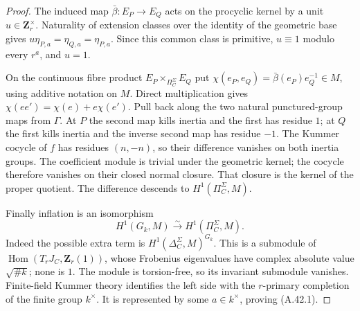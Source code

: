 \begin{proof}
The induced map $\bar\beta:E_P\to E_Q$ acts on the procyclic
kernel by a unit $u\in\mathbf Z_r^\times$. Naturality of
extension classes over the identity of the geometric base gives
$u\eta_{P,a}=\eta_{Q,a}=\eta_{P,a}$. Since this common class
is primitive, $u\equiv1$
modulo every $r^a$, and $u=1$.

On the continuous fibre product $E_P\times_{\Pi_C^\Sigma}E_Q$
put $\chi(e_P,e_Q)=\bar\beta(e_P)e_Q^{-1}\in M$, using additive
notation on $M$. Direct multiplication gives
$\chi(ee')=\chi(e)+e\chi(e')$. Pull back along the two natural
punctured-group maps from $\Gamma$. At $P$ the second map kills
inertia and the first has residue $1$; at $Q$ the first kills
inertia and the inverse second map has residue $-1$.
The Kummer cocycle of $f$ has residues $(n,-n)$, so their
difference vanishes on both inertia groups. The coefficient
module is trivial under the geometric kernel; the cocycle
therefore vanishes on their closed normal closure. That closure
is the kernel of the proper quotient. The difference descends
to $H^1(\Pi_C^\Sigma,M)$.

Finally inflation is an isomorphism
\[
                  H^1(G_k,M)\xrightarrow{\sim}
                  H^1(\Pi_C^\Sigma,M).
\]
Indeed the possible extra term is
$H^1(\Delta_C^\Sigma,M)^{G_k}$. This is a submodule of
$\operatorname{Hom}(T_rJ_C,\mathbf Z_r(1))$, whose Frobenius
eigenvalues have complex absolute value $\sqrt{\#k}$; none is
$1$. The module is torsion-free, so its invariant submodule
vanishes. Finite-field Kummer theory identifies the left side
with the $r$-primary completion of the finite group $k^\times$.
It is represented by some $a\in k^\times$, proving (A.42.1).
\end{proof}

